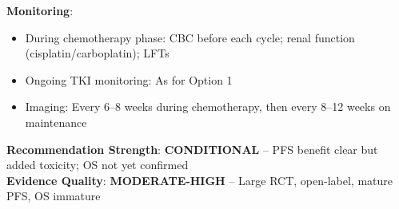 \documentclass[10pt,letterpaper]{article}
\begin{document}
\begin{tcolorbox}
{\textbf{Monitoring}:
\begin{itemize}
\item During chemotherapy phase: CBC before each cycle; renal function (cisplatin/carboplatin); LFTs
\item Ongoing TKI monitoring: As for Option 1
\item Imaging: Every 6--8 weeks during chemotherapy, then every 8--12 weeks on maintenance
\end{itemize}

\textbf{Recommendation Strength}: \textbf{CONDITIONAL} -- PFS benefit clear but added toxicity; OS not yet confirmed\\
\textbf{Evidence Quality}: \textbf{MODERATE-HIGH} -- Large RCT, open-label, mature PFS, OS immature
}
\end{tcolorbox}

\vspace{3pt}
\end{document}
